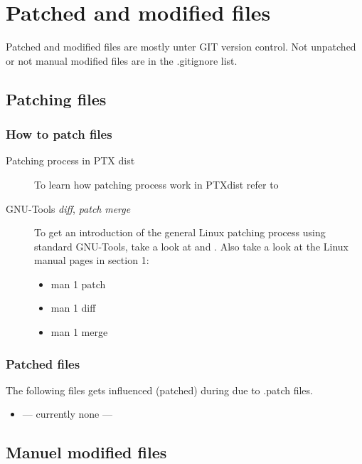 

\chapter{Patched and modified files}%
\label{cha:Patched and modified files}

Patched and modified files are mostly unter GIT version control. Not unpatched
or not manual modified files are in the .gitignore list.

\section{Patching files}%
\label{sec:Pached files}

\subsection{How to patch files}%
\label{sub:How to pach files}
\begin{description}
    \item[Patching process in PTX dist]
        To learn how patching process work in PTXdist refer to \cite{todo}
    \item[GNU-Tools \textit{diff},  \textit{patch} \textit{merge}] To get an
        introduction of the general Linux patching process using
        standard GNU-Tools, take a look at
        \cite[GNU Diff and Patch]{GNUPatchTools:Patch_Diff_Exaples} and
        \cite[GNU Merge]{GNUPatchTools:Merge_Examples}. Also take a look at the
        Linux manual pages in section 1:
        \begin{itemize}
            \item man 1 patch
            \item man 1 diff
            \item man 1 merge
        \end{itemize}
\end{description}

\subsection{Patched files}%
\label{sub:Patched fiels}
The following files gets influenced (patched) during due to .patch files.

\begin{itemize}
    \item --- currently none ---
\end{itemize}


\section{Manuel modified files}%
\label{sec:Manuel modified files}

